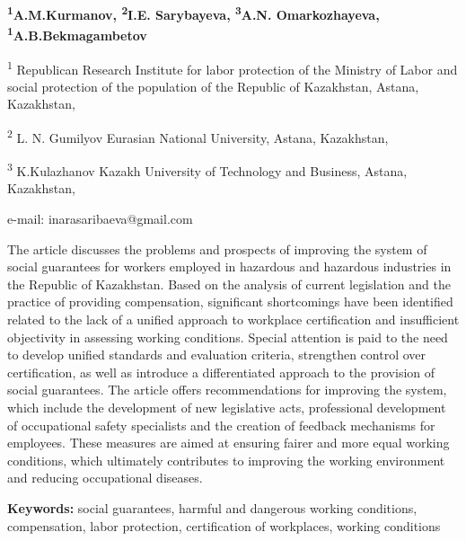 \begin{center}
{\bfseries \textsuperscript{1}A.M.Kurmanov, \textsuperscript{2}I.E.
Sarybayeva\envelope, \textsuperscript{3}A.N. Omarkozhayeva,
\textsuperscript{1}A.B.Bekmagambetov}

\textsuperscript{1} Republican Research Institute for labor protection
of the Ministry of Labor and social protection of the population of the
Republic of Kazakhstan, Astana, Kazakhstan,

\textsuperscript{2} L. N. Gumilyov Eurasian National University, Astana,
Kazakhstan,

\textsuperscript{3} K.Kulazhanov Kazakh University of Technology and
Business, Astana, Kazakhstan,

e-mail: inarasaribaeva@gmail.com
\end{center}

The article discusses the problems and prospects of improving the system
of social guarantees for workers employed in hazardous and hazardous
industries in the Republic of Kazakhstan. Based on the analysis of
current legislation and the practice of providing compensation,
significant shortcomings have been identified related to the lack of a
unified approach to workplace certification and insufficient objectivity
in assessing working conditions. Special attention is paid to the need
to develop unified standards and evaluation criteria, strengthen control
over certification, as well as introduce a differentiated approach to
the provision of social guarantees. The article offers recommendations
for improving the system, which include the development of new
legislative acts, professional development of occupational safety
specialists and the creation of feedback mechanisms for employees. These
measures are aimed at ensuring fairer and more equal working conditions,
which ultimately contributes to improving the working environment and
reducing occupational diseases.

{\bfseries Keywords:} social guarantees, harmful and dangerous working
conditions, compensation, labor protection, certification of workplaces,
working conditions

